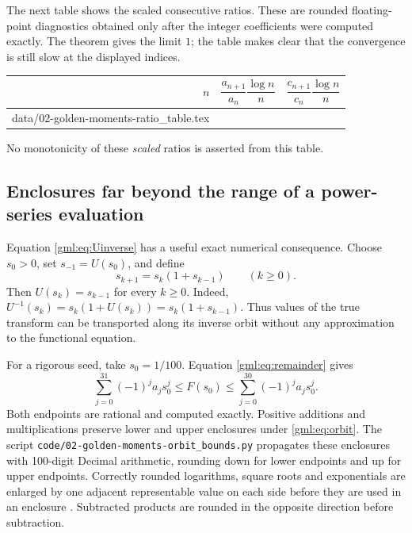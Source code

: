 \documentclass[11pt]{article}
\makeatletter
\numberwithin{equation}{section}
\theoremstyle{definition}
\theoremstyle{remark}
\newcommand{\tableinput}[1]{\@@input #1 }
\makeatother
\begin{document}
The next table shows the scaled consecutive ratios. These are rounded
floating-point diagnostics obtained only after the integer coefficients
were computed exactly. The theorem gives the limit $1$; the table makes
clear that the convergence is still slow at the displayed indices.
\begin{center}
\begin{tabular}{rcc}
\toprule
$n$&$\dfrac{a_{n+1}}{a_n}\dfrac{\log n}{n}$
   &$\dfrac{c_{n+1}}{c_n}\dfrac{\log n}{n}$\\[5pt]
\midrule
\tableinput{data/02-golden-moments-ratio_table.tex}
\bottomrule
\end{tabular}
\end{center}
No monotonicity of these \emph{scaled} ratios is asserted from this table.

\subsection{Enclosures far beyond the range of a power-series evaluation}
Equation \eqref{gml:eq:Uinverse} has a useful exact numerical consequence.
Choose $s_0>0$, set $s_{-1}=U(s_0)$, and define
\begin{equation}\label{gml:eq:orbit}
 s_{k+1}=s_k(1+s_{k-1})\qquad(k\ge0).
\end{equation}
Then $U(s_k)=s_{k-1}$ for every $k\ge0$. Indeed,
$U^{-1}(s_k)=s_k(1+U(s_k))=s_k(1+s_{k-1})$.
Thus values of the true transform can be transported along its inverse
orbit without any approximation to the functional equation.

For a rigorous seed, take $s_0=1/100$. Equation \eqref{gml:eq:remainder} gives
\begin{equation}\label{gml:eq:seedbounds}
 \sum_{j=0}^{31}(-1)^ja_js_0^j\le F(s_0)
 \le\sum_{j=0}^{30}(-1)^ja_js_0^j.
\end{equation}
Both endpoints are rational and computed exactly. Positive additions and
multiplications preserve lower and upper enclosures under
\eqref{gml:eq:orbit}. The script \texttt{code/02-golden-moments-orbit\_bounds.py} propagates
these enclosures with 100-digit Decimal arithmetic, rounding down for
lower endpoints and up for upper endpoints. Correctly rounded logarithms,
square roots and exponentials are enlarged by one adjacent representable
value on each side before they are used in an enclosure \cite{decimal}.
Subtracted products are rounded in the opposite direction before subtraction.
\end{document}
